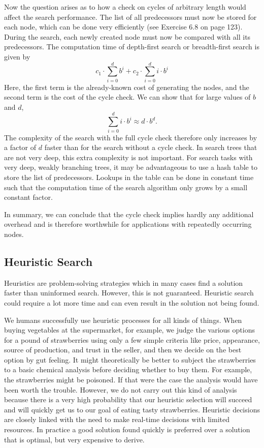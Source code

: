 \documentclass[10pt]{book}
\begin{document}
Now the question arises as to how a check on cycles of arbitrary length would affect the search performance. The list of all predecessors must now be stored for each node, which can be done very efficiently (see Exercise 6.8 on page 123). During the search, each newly created node must now be compared with all its predecessors. The computation time of depth-first search or breadth-first search is given by
$$
c_{1} \cdot \sum_{i=0}^{d} b^{i} + c_{2} \cdot \sum_{i=0}^{d} i \cdot b^{i}
$$
Here, the first term is the already-known cost of generating the nodes, and the second term is the cost of the cycle check. We can show that for large values of $b$ and $d$,
$$
\sum_{i=0}^{d} i \cdot b^{i} \approx d \cdot b^{d}.
$$
The complexity of the search with the full cycle check therefore only increases by a factor of $d$ faster than for the search without a cycle check. In search trees that are not very deep, this extra complexity is not important. For search tasks with very deep, weakly branching trees, it may be advantageous to use a hash table \cite{cormen1990introduction} to store the list of predecessors. Lookups in the table can be done in constant time such that the computation time of the search algorithm only grows by a small constant factor.

In summary, we can conclude that the cycle check implies hardly any additional overhead and is therefore worthwhile for applications with repeatedly occurring nodes.

\subsection{Heuristic Search}
Heuristics are problem-solving strategies which in many cases find a solution faster than uninformed search. However, this is not guaranteed. Heuristic search could require a lot more time and can even result in the solution not being found.

We humans successfully use heuristic processes for all kinds of things. When buying vegetables at the supermarket, for example, we judge the various options for a pound of strawberries using only a few simple criteria like price, appearance, source of production, and trust in the seller, and then we decide on the best option by gut feeling. It might theoretically be better to subject the strawberries to a basic chemical analysis before deciding whether to buy them. For example, the strawberries might be poisoned. If that were the case the analysis would have been worth the trouble. However, we do not carry out this kind of analysis because there is a very high probability that our heuristic selection will succeed and will quickly get us to our goal of eating tasty strawberries.
Heuristic decisions are closely linked with the need to make real-time decisions with limited resources. In practice a good solution found quickly is preferred over a solution that is optimal, but very expensive to derive.
\end{document}
